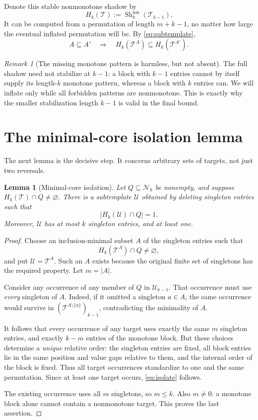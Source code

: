 \documentclass[11pt,a4paper]{article}
\newtheorem{lemma}[theorem]{Lemma}
\theoremstyle{definition}
\theoremstyle{remark}
\newtheorem{remark}[theorem]{Remark}
\DeclareMathOperator{\Sh}{Sh}
\newcommand{\Nk}{\mathcal N_k}
\newcommand{\Tm}{\mathcal T}
\newcommand{\Um}{\mathcal U}
\newcommand{\shn}[1]{\Sh_k^{\mathrm{nm}}(#1)}
\begin{document}
Denote this stable nonmonotone shadow by
\[
 H_k(\Tm):=\shn{\Tm_{k-1}}.
\]
It can be computed from a permutation of length $m+k-1$, no matter how large
the eventual inflated permutation will be. By \eqref{eq:subtemplate},
\begin{equation}\label{eq:shadowmonotonicity}
 A\subseteq A'\quad\Longrightarrow\quad
 H_k(\Tm^A)\subseteq H_k(\Tm^{A'}).
\end{equation}

\begin{remark}[The missing monotone pattern is harmless, but not absent]
The full shadow need not stabilize at $k-1$: a block with $k-1$ entries
cannot by itself supply its length-$k$ monotone pattern, whereas a block with
$k$ entries can. We will inflate only while all forbidden patterns are
nonmonotone. This is exactly why the smaller stabilization length $k-1$ is
valid in the final bound.
\end{remark}

\section{The minimal-core isolation lemma}
\label{sec:minimal}

The next lemma is the decisive step. It concerns arbitrary sets of targets,
not just two reversals.

\begin{lemma}[Minimal-core isolation]\label{lem:minimal}
Let $Q\subseteq\Nk$ be nonempty, and suppose $H_k(\Tm)\cap Q\ne\varnothing$.
There is a subtemplate $\Um$ obtained by deleting singleton entries such that
\begin{equation}\label{eq:isolate}
 |H_k(\Um)\cap Q|=1.
\end{equation}
Moreover, $\Um$ has at most $k$ singleton entries, and at least one.
\end{lemma}
\begin{proof}
Choose an inclusion-minimal subset $A$ of the singleton entries such that
\[
 H_k(\Tm^A)\cap Q\ne\varnothing,
\]
and put $\Um=\Tm^A$. Such an $A$ exists because the original finite set of
singletons has the required property. Let $m=|A|$.

Consider any occurrence of any member of $Q$ in $\Um_{k-1}$. That occurrence
must use \emph{every} singleton of $A$. Indeed, if it omitted a singleton
$a\in A$, the same occurrence would survive in
$(\Tm^{A\setminus\{a\}})_{k-1}$, contradicting the minimality of $A$.

It follows that every occurrence of any target uses exactly the same $m$
singleton entries, and exactly $k-m$ entries of the monotone block. But these
choices determine a \emph{unique} relative order: the singleton entries are
fixed, all block entries lie in the same position and value gaps relative
to them, and the internal order of the block is fixed. Thus all target
occurrences standardize to one and the same permutation. Since at least one
target occurs, \eqref{eq:isolate} follows.

The existing occurrence uses all $m$ singletons, so $m\le k$. Also $m\ne0$:
a monotone block alone cannot contain a nonmonotone target. This proves the
last assertion.
\end{proof}
\end{document}
